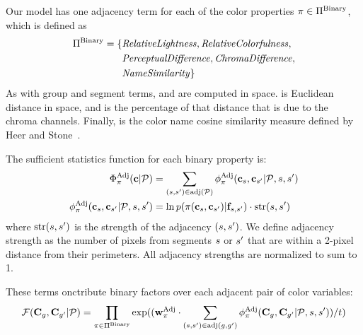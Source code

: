 
Our model has one adjacency term for each of the color properties $ \pi \in \Pi^{\textrm{Binary}}$, which is defined as
\begin{align*}
\Pi^{\textrm{Binary}} = \{ &\text{\emph{RelativeLightness}}, \text{\emph{RelativeColorfulness}}, \\
                  &\text{\emph{PerceptualDifference}}, \text{\emph{ChromaDifference}}, \\
                  &\text{\emph{NameSimilarity}} \}
\end{align*}
As with group and segment terms,  and  are computed in \lab space.  is Euclidean distance in \lab space, and  is the percentage of that distance that is due to the chroma channels. Finally,  is the color name cosine similarity measure defined by Heer and Stone~.

The sufficient statistics function for each binary property is:
 \begin{align*}
 \Phi^{\textrm{Adj}}_\pi(\mathbf{c} | \mathcal{P}) &= \sum_{(s, {s^{\prime}}) \in \text{adj}(\mathcal{P})} \phi^{\textrm{Adj}}_\pi(\mathbf{c}_s, \mathbf{c}_{s^{\prime}} | \mathcal{P}, s, {s^{\prime}}) \\
 \phi^{\textrm{Adj}}_\pi(\mathbf{c}_s, \mathbf{c}_{s^{\prime}} | \mathcal{P}, s, {s^{\prime}}) &= \ln p( \pi( \mathbf{c}_s, \mathbf{c}_{s^{\prime}} ) | \mathbf{f}_{s, {s^{\prime}}} ) \cdot \text{str}(s, {s^{\prime}})
\end{align*}
where $\text{str}(s,{s^{\prime}})$ is the strength of the adjacency $(s,{s^{\prime}})$. We define adjacency strength as the number of pixels from segments $s$ or ${s^{\prime}}$ that are within a 2-pixel distance from their perimeters. All adjacency strengths are normalized to sum to 1.  

These terms onctribute binary factors over each adjacent pair of color variables:
\begin{equation*}
 \mathcal{F}(\mathbf{C}_g, \mathbf{C}_{g^{\prime}} | \mathcal{P}) = \prod_{\pi \in \Pi^{\textrm{Binary}}} \exp( (\mathbf{w}^{\textrm{Adj}}_\pi \cdot \sum_{(s, {s^{\prime}}) \in \text{adj}(g, {g^{\prime}})} \phi^{\textrm{Adj}}_\pi( \mathbf{C}_g, \mathbf{C}_{g^{\prime}} | \mathcal{P}, s, {s^{\prime}})) / t) 
\end{equation*}

